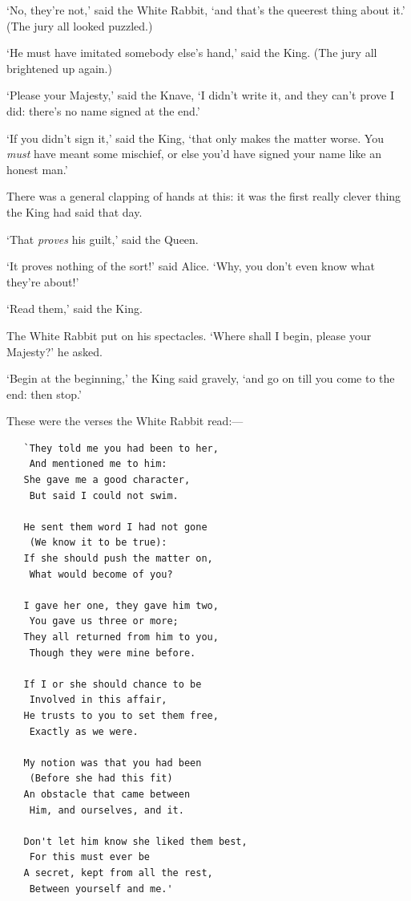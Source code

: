 \documentclass[12pt,openany]{memoir}
\begin{document}
`No, they're not,' said the White Rabbit, `and that's the queerest thing about it.' (The jury all looked puzzled.)

`He must have imitated somebody else's hand,' said the King. (The jury all brightened up again.)

`Please your Majesty,' said the Knave, `I didn't write it, and they can't prove I did: there's no name signed at the end.'

`If you didn't sign it,' said the King, `that only makes the matter worse. You \textit{must} have meant some mischief, or else you'd have signed your name like an honest man.'

There was a general clapping of hands at this: it was the first really clever thing the King had said that day.

`That \textit{proves} his guilt,' said the Queen.

`It proves nothing of the sort!' said Alice. `Why, you don't even know what they're about!'

`Read them,' said the King.

The White Rabbit put on his spectacles. `Where shall I begin, please your Majesty?' he asked.

`Begin at the beginning,' the King said gravely, `and go on till you come to the end: then stop.'

These were the verses the White Rabbit read:---

\begin{verbatim}
   `They told me you had been to her,
    And mentioned me to him:
   She gave me a good character,
    But said I could not swim.

   He sent them word I had not gone
    (We know it to be true):
   If she should push the matter on,
    What would become of you?

   I gave her one, they gave him two,
    You gave us three or more;
   They all returned from him to you,
    Though they were mine before.

   If I or she should chance to be
    Involved in this affair,
   He trusts to you to set them free,
    Exactly as we were.

   My notion was that you had been
    (Before she had this fit)
   An obstacle that came between
    Him, and ourselves, and it.

   Don't let him know she liked them best,
    For this must ever be
   A secret, kept from all the rest,
    Between yourself and me.'
\end{verbatim}
\end{document}
